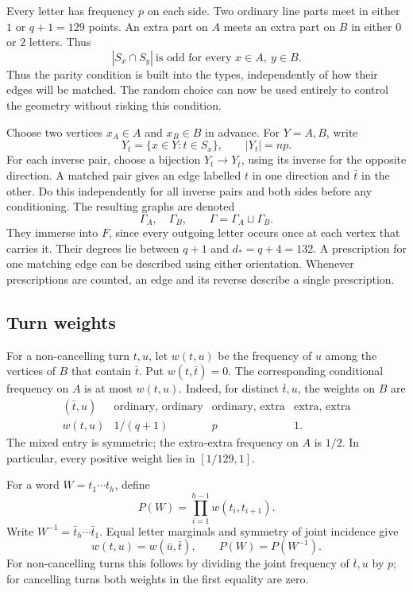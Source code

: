 Every letter has frequency \(p\) on each side. Two ordinary line parts meet in either \(1\) or \(q+1=129\) points. An extra part on \(A\) meets an extra part on \(B\) in either \(0\) or \(2\) letters. Thus
\begin{equation}\label{eq:odd-intersections}
 |S_x\cap S_y|\ \text{is odd for every }x\in A,\ y\in B.
\end{equation}
Thus the parity condition is built into the types, independently of
how their edges will be matched. The random choice can now be used
entirely to control the geometry without risking this condition.

Choose two vertices \(x_A\in A\) and \(x_B\in B\) in advance. For \(Y=A,B\), write
\[
Y_t=\{x\in Y:t\in S_x\},\qquad |Y_t|=np.
\]
For each inverse pair, choose a bijection \(Y_t\to Y_{\bar t}\), using its inverse for the opposite direction. A matched pair gives an edge labelled \(t\) in one direction and \(\bar t\) in the other. Do this independently for all inverse pairs and both sides before any conditioning. The resulting graphs are denoted
\[
\Gamma_A,\quad\Gamma_B,\qquad
\Gamma=\Gamma_A\sqcup\Gamma_B.
\]
They immerse into \(F\), since every outgoing letter occurs once at each vertex that carries it. Their degrees lie between \(q+1\) and
\(d_*=q+4=132\).
A prescription for one matching edge can be described using either orientation. Whenever prescriptions are counted, an edge and its reverse describe a single prescription.

\subsection{Turn weights}

For a non-cancelling turn \(t,u\), let \(w(t,u)\) be the frequency of \(u\) among the vertices of \(B\) that contain \(\bar t\). Put \(w(t,\bar t)=0\). The corresponding conditional frequency on \(A\) is at most \(w(t,u)\). Indeed, for distinct \(\bar t,u\), the weights on \(B\) are
\[
\begin{array}{c|ccc}
(\bar t,u)&\text{ordinary, ordinary}&
\text{ordinary, extra}&\text{extra, extra}\\ \hline
w(t,u)&1/(q+1)&p&1.
\end{array}
\]
The mixed entry is symmetric; the extra-extra frequency on \(A\) is \(1/2\). In particular, every positive weight lies in \([1/129,1]\).

For a word \(W=t_1\cdots t_h\), define
\begin{equation}\label{eq:word-weight}
P(W)=\prod_{i=1}^{h-1}w(t_i,t_{i+1}).
\end{equation}
Write \(W^{-1}=\bar t_h\cdots\bar t_1\). Equal letter marginals and symmetry of joint incidence give
\begin{equation}\label{eq:reversal-weight}
w(t,u)=w(\bar u,\bar t),\qquad P(W)=P(W^{-1}).
\end{equation}
For non-cancelling turns this follows by dividing the joint frequency of
\(\bar t,u\) by \(p\); for cancelling turns both weights in the first equality are zero.

